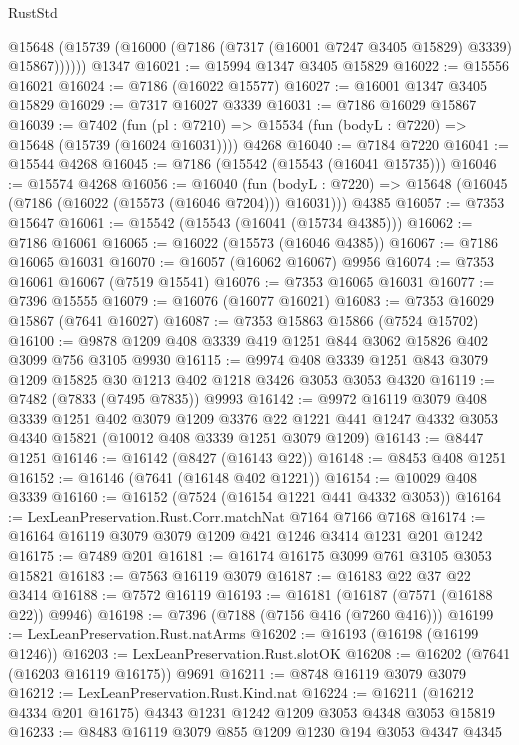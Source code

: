 \begin{lexlean}{RustStd}
\begin{coremodule}
{\begin{coremodule}
{{{{{{{{{{{{{{{{{{{{{{{{{{{{{{{{        @15648 (@15739 (@16000 (@7186 (@7317 (@16001 @7247 @3405 @15829) @3339) @15867))))))
    @1347
@16021 := @15994 @1347 @3405 @15829
@16022 := @15556 @16021
@16024 := @7186 (@16022 @15577)
@16027 := @16001 @1347 @3405 @15829
@16029 := @7317 @16027 @3339
@16031 := @7186 @16029 @15867
@16039 := @7402
    (fun (pl : @7210) => @15534 (fun (bodyL : @7220) => @15648 (@15739 (@16024 @16031))))
    @4268
@16040 := @7184 @7220
@16041 := @15544 @4268
@16045 := @7186 (@15542 (@15543 (@16041 @15735)))
@16046 := @15574 @4268
@16056 := @16040
    (fun (bodyL : @7220) => @15648 (@16045 (@7186 (@16022 (@15573 (@16046 @7204))) @16031)))
    @4385
@16057 := @7353 @15647
@16061 := @15542 (@15543 (@16041 (@15734 @4385)))
@16062 := @7186 @16061
@16065 := @16022 (@15573 (@16046 @4385))
@16067 := @7186 @16065 @16031
@16070 := @16057 (@16062 @16067) @9956
@16074 := @7353 @16061 @16067 (@7519 @15541)
@16076 := @7353 @16065 @16031
@16077 := @7396 @15555
@16079 := @16076 (@16077 @16021)
@16083 := @7353 @16029 @15867 (@7641 @16027)
@16087 := @7353 @15863 @15866 (@7524 @15702)
@16100 := @9878 @1209 @408 @3339 @419 @1251 @844 @3062 @15826 @402 @3099 @756 @3105 @9930
@16115 := @9974
    @408
    @3339
    @1251
    @843
    @3079
    @1209
    @15825
    @30
    @1213
    @402
    @1218
    @3426
    @3053
    @3053
    @4320
@16119 := @7482 (@7833 (@7495 @7835)) @9993
@16142 := @9972
    @16119
    @3079
    @408
    @3339
    @1251
    @402
    @3079
    @1209
    @3376
    @22
    @1221
    @441
    @1247
    @4332
    @3053
    @4340
    @15821
    (@10012 @408 @3339 @1251 @3079 @1209)
@16143 := @8447 @1251
@16146 := @16142 (@8427 (@16143 @22))
@16148 := @8453 @408 @1251
@16152 := @16146 (@7641 (@16148 @402 @1221))
@16154 := @10029 @408 @3339
@16160 := @16152 (@7524 (@16154 @1221 @441 @4332 @3053))
@16164 := LexLeanPreservation.Rust.Corr.matchNat @7164 @7166 @7168
@16174 := @16164 @16119 @3079 @3079 @1209 @421 @1246 @3414 @1231 @201 @1242
@16175 := @7489 @201
@16181 := @16174 @16175 @3099 @761 @3105 @3053 @15821
@16183 := @7563 @16119 @3079
@16187 := @16183 @22 @37 @22 @3414
@16188 := @7572 @16119
@16193 := @16181 (@16187 (@7571 (@16188 @22)) @9946)
@16198 := @7396 (@7188 (@7156 @416 (@7260 @416)))
@16199 := LexLeanPreservation.Rust.natArms
@16202 := @16193 (@16198 (@16199 @1246))
@16203 := LexLeanPreservation.Rust.slotOK
@16208 := @16202 (@7641 (@16203 @16119 @16175)) @9691
@16211 := @8748 @16119 @3079 @3079
@16212 := LexLeanPreservation.Rust.Kind.nat
@16224 := @16211 (@16212 @4334 @201 @16175) @4343 @1231 @1242 @1209 @3053 @4348 @3053 @15819
@16233 := @8483 @16119 @3079 @855 @1209 @1230 @194 @3053 @4347 @4345
}}}}}}}}}}}}}}}}}}}}}}}}}}}}}}}}
\end{coremodule}}
\end{coremodule}
\end{lexlean}
